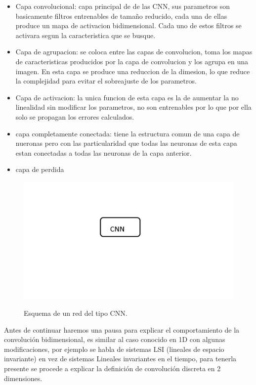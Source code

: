 \begin{itemize}
    \item Capa convolucional: capa principal de de las CNN, sus parametros son basicamente filtros entrenables de tamaño reducido, cada una 
    de ellas produce un mapa de activacion bidimensional. Cada uno de estos filtros se activara segun la caracteristica que se busque.
    \item Capa de agrupacion: se coloca entre las capas de convolucion, toma los mapas de caracteristicas producidos por la capa de 
    convolucion y los agrupa en una imagen. En esta capa se produce una reduccion de la dimesion, lo que reduce la complejidad para evitar el sobreajuste de los parametros.
    \item Capa de activacion: la unica funcion de esta capa es la de aumentar la no linealidad sin modificar los parametros, no son entrenables 
    por lo que por ella solo se propagan los errores calculados.
    \item capa completamente conectada: tiene la estructura comun de una capa de nueronas pero con las particularidad que todas las neuronas 
    de esta capa estan conectadas a todas las neuronas de la capa anterior.
    \item capa de perdida
\end{itemize}
\begin{figure}
    \centering
    \includegraphics[width=1\textwidth]{imgs/CNN-completa.jpg}
    \label{fig:esquema-CNN}
    \caption{Esquema de un red del tipo CNN.}
\end{figure}
Antes de continuar haremos una pausa para explicar el comportamiento de la convolución bidimensional, es similar al caso conocido en 1D con 
algunas modificaciones, por ejemplo se habla de sistemas LSI (lineales de espacio invariante) en vez de sistemas Lineales invariantes 
en el tiempo, para tenerla presente se procede a explicar la definición de convolución discreta en 2  dimensiones.

